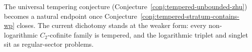 The universal tempering conjecture
(Conjecture~\ref{conj:tempered-unbounded-zhu}) becomes a natural
endpoint once Conjecture~\ref{conj:tempered-stratum-contains-wp}
closes. The current dichotomy stands at the weaker form: every
non-logarithmic $C_2$-cofinite family is tempered, and the
logarithmic triplet and singlet sit as regular-sector problems.
